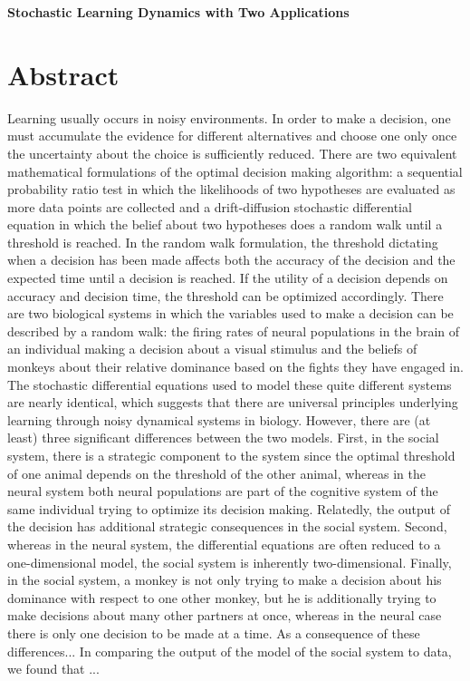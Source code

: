 \documentclass{article}
\begin{document}
\begin{center}
\Large

\end{center}


\vspace{0pt}

\begin{center}
{\bf \LARGE{Stochastic Learning Dynamics with Two Applications}}
\end{center}

\tableofcontents

\section{Abstract}
Learning usually occurs in noisy environments.  In order to make a decision, one must accumulate the  evidence for different alternatives and choose one only once the uncertainty about the choice is sufficiently reduced.  There are two equivalent mathematical formulations of the optimal decision making algorithm: a sequential probability ratio test in which the likelihoods of two hypotheses are evaluated as more data points are collected and a drift-diffusion stochastic differential equation in which the belief about two hypotheses does a random walk until a threshold is reached.  In the random walk formulation, the threshold dictating when a decision has been made affects both the accuracy of the decision and the expected time until a decision is reached.  If the utility of a decision depends on accuracy and decision time, the threshold can be optimized accordingly.  There are two biological systems in which the variables used to make a decision can be described by a random walk: the firing rates of neural populations in the brain of an individual making a decision about a visual stimulus and the beliefs of monkeys about their relative dominance based on the fights they have engaged in.  The stochastic differential equations used to model these quite different systems are nearly identical, which suggests that there are universal principles underlying learning through noisy dynamical systems in biology.  However, there are (at least) three significant differences between the two models.  First, in the social system, there is a strategic component to the system since the optimal threshold of one animal depends on the threshold of the other animal, whereas in the neural system both neural populations are part of the cognitive system of the same individual trying to optimize its decision making.  Relatedly, the output of the decision has additional strategic consequences in the social system.  Second, whereas in the neural system, the differential equations are often reduced to a one-dimensional model, the social system is inherently two-dimensional.  Finally, in the social system, a monkey is not only trying to make a decision about his dominance with respect to one other monkey, but he is additionally trying to make decisions about many other partners at once, whereas in the neural case there is only one decision to be made at a time.  As a consequence of these differences... In comparing the output of the model of the social system to data, we found that ...
\end{document}
